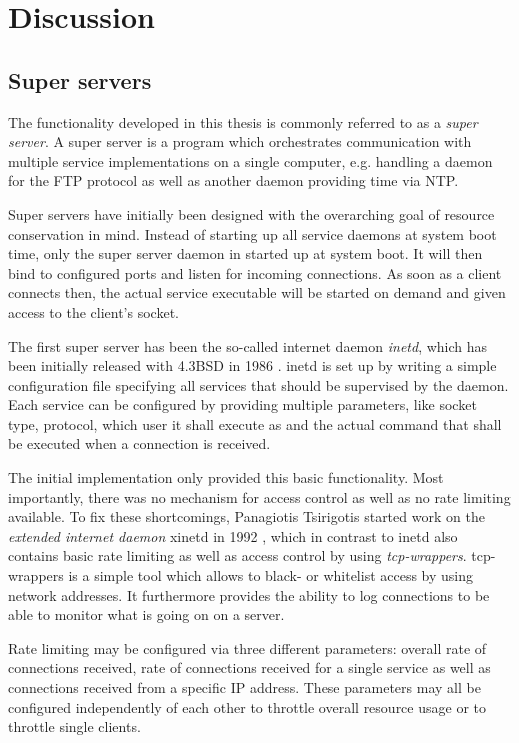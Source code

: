 \chapter{Discussion}

\section{Super servers}

The functionality developed in this thesis is commonly referred to as a \emph{super server}.
A super server is a program which orchestrates communication with multiple service implementations on a single computer, e.g. handling a daemon for the FTP protocol as well as another daemon providing time via NTP.

Super servers have initially been designed with the overarching goal of resource conservation in mind.
Instead of starting up all service daemons at system boot time, only the super server daemon in started up at system boot.
It will then bind to configured ports and listen for incoming connections.
As soon as a client connects then, the actual service executable will be started on demand and given access to the client's socket.

The first super server has been the so-called internet daemon \emph{inetd}, which has been initially released with 4.3BSD in 1986 \cite{inetd}.
inetd is set up by writing a simple configuration file specifying all services that should be supervised by the daemon.
Each service can be configured by providing multiple parameters, like socket type, protocol, which user it shall execute as and the actual command that shall be executed when a connection is received.

The initial implementation only provided this basic functionality.
Most importantly, there was no mechanism for access control as well as no rate limiting available.
To fix these shortcomings, Panagiotis Tsirigotis started work on the \emph{extended internet daemon} xinetd in 1992 \cite{xinetd}, which in contrast to inetd also contains basic rate limiting as well as access control by using \emph{tcp-wrappers}.
tcp-wrappers \cite{venema1992tcp} is a simple tool which allows to black- or whitelist access by using network addresses.
It furthermore provides the ability to log connections to be able to monitor what is going on on a server.

Rate limiting may be configured via three different parameters: overall rate of connections received, rate of connections received for a single service as well as connections received from a specific IP address.
These parameters may all be configured independently of each other to throttle overall resource usage or to throttle single clients.

